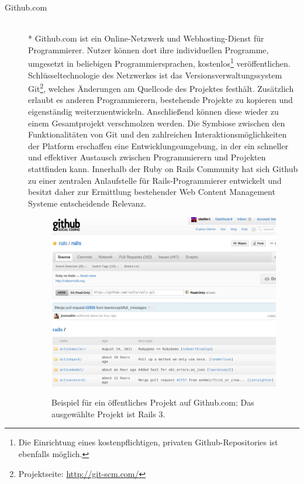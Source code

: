 \begin{description}
\begin{figure}[!h]
\begin{center}
\end{center}
\end{figure}
\newpage
\item[Github.com]\mbox{~}\\*
Github.com ist ein Online-Netzwerk und Webhosting-Dienst für Programmierer. Nutzer können dort ihre individuellen Programme, umgesetzt in beliebigen Programmiersprachen, kostenlos\footnote{Die Einrichtung eines kostenpflichtigen, privaten Github-Repositories ist ebenfalls möglich.}  veröffentlichen.
Schlüsseltechnologie des Netzwerkes ist das Versionsverwaltungssystem Git\footnote{Projektseite: \href{http://git-scm.com/}{http://git-scm.com/}}, welches Änderungen am Quellcode des Projektes festhält. Zusätzlich erlaubt es anderen Programmierern, bestehende Projekte zu kopieren und eigenständig weiterzuentwickeln. Anschließend können diese wieder zu einem Gesamtprojekt verschmolzen werden.
Die Symbiose zwischen den Funktionalitäten von Git und den zahlreichen Interaktionsmöglichkeiten der Platform erschaffen eine Entwicklungsumgebung, in der ein schneller und effektiver Austausch zwischen Programmierern und Projekten stattfinden kann.
Innerhalb der Ruby on Rails Community hat sich Github zu einer zentralen Anlaufstelle für Rails-Programmierer entwickelt und besitzt daher zur Ermittlung bestehender Web Content Management Systeme entscheidende Relevanz.
\begin{figure}[!h]
\begin{center}
\label{fig.github}
\includegraphics[scale=0.45]{images/analyse/github/github.png}
\caption[Öffentliches Projekt auf Github.com]{Beispiel für ein öffentliches Projekt auf Github.com: Das ausgewählte Projekt ist Rails 3.}
\end{center}
\end{figure}
\end{description}

